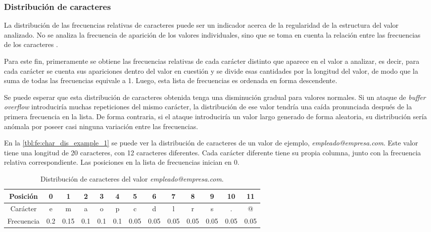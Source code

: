 \subsubsection{Distribución de caracteres}

La distribución de las frecuencias relativas de caracteres puede ser un
indicador acerca de la regularidad de la estructura del valor analizado.
No se analiza la frecuencia de aparición de los valores individuales, sino
que se toma en cuenta la relación entre las frecuencias de los caracteres
\citep{kruegel2003anomaly}. %

Para este fin, primeramente se obtiene las frecuencias relativas de cada
carácter distinto que aparece en el valor a analizar, es decir, para cada
carácter se cuenta sus apariciones dentro del valor en cuestión y se
divide esas cantidades por la longitud del valor, de modo que la suma
de todas las frecuencias equivale a 1. Luego, esta lista de frecuencias
es ordenada en forma descendente.

Se puede esperar que esta distribución de caracteres obtenida tenga una
disminución gradual para valores normales. Si un ataque de \textit{buffer overflow}
introduciría muchas repeticiones del mismo carácter, la distribución de ese
valor tendría una caída pronunciada después de la primera frecuencia en la
lista. De forma contraria, si el ataque introduciría un valor largo generado
de forma aleatoria, su distribución sería anómala por poseer casi ninguna
variación entre las frecuencias.

En la \autoref{tbl:fe:char_dis_example_1} se puede ver la distribución de
caracteres de un valor de ejemplo, \textit{empleado@empresa.com}. Este
valor tiene una longitud de 20 caracteres, con 12 caracteres diferentes.
Cada carácter diferente tiene su propia columna, junto con la frecuencia
relativa correspondiente. Las posiciones en la lista de frecuencias
inician en 0.

\begin{table}[ht]
    \centering
    \small
    \begin{tabularx}{\linewidth}{C|c|c|c|c|c|c|c|c|c|c|c|c}
        Posición   & 0         & 1          & 2         & 3         & 4         & 5          & 6          & 7          & 8          & 9          & 10         & 11 \\ \hline
        Carácter   & e         & m          & a         & o         & p         & c          & d          & l          & r          & s          & .          & @  \\ \hline
        Frecuencia & \num{0.2} & \num{0.15} & \num{0.1} & \num{0.1} & \num{0.1} & \num{0.05} & \num{0.05} & \num{0.05} & \num{0.05} & \num{0.05} & \num{0.05} & \num{0.05}
    \end{tabularx}

    \caption{Distribución de caracteres del valor \textit{empleado@empresa.com}.}
    \label{tbl:fe:char_dis_example_1}
\end{table}

